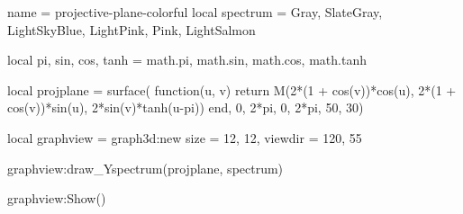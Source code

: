 \documentclass{standalone}
\begin{document}
\begin{luadraw}{name = projective-plane-colorful}
local spectrum = {Gray, SlateGray, LightSkyBlue, LightPink, Pink, LightSalmon}

local pi, sin, cos, tanh = math.pi, math.sin, math.cos, math.tanh

local projplane = surface(
  function(u, v)
    return M(2*(1 + cos(v))*cos(u), 2*(1 + cos(v))*sin(u), 2*sin(v)*tanh(u-pi))
  end,
  0, 2*pi, 0,  2*pi,
  {50, 30})

local graphview = graph3d:new{
  size    = {12, 12},
  viewdir = {120, 55}
}

graphview:draw_Yspectrum(projplane, spectrum)

graphview:Show()
\end{luadraw}
\end{document}
